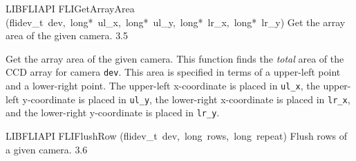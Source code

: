 \documentclass{article}
\begin{document}
\begin{cxxentry}
\begin{cxxfunction}
\begin{cxxdoc}
\end{cxxdoc}
\end{cxxfunction}
\begin{cxxfunction}
{LIBFLIAPI}
        {FLIGetArrayArea}
        {(flidev\_t\ dev,\ long*\ ul\_x,\ long*\ ul\_y,\ long*\ lr\_x,\ long*\ lr\_y)}
        { Get the array area of the given camera.}
        {3.5}
\begin{cxxdoc}

Get the array area of the given camera.  This function finds the
\emph{total} area of the CCD array for camera \texttt{dev}.  This
area is specified in terms of a upper-left point and a lower-right
point.  The upper-left x-coordinate is placed in \texttt{ul\_x}, the
upper-left y-coordinate is placed in \texttt{ul\_y}, the lower-right
x-coordinate is placed in \texttt{lr\_x}, and the lower-right
y-coordinate is placed in \texttt{lr\_y}.


\end{cxxdoc}
\end{cxxfunction}
\begin{cxxfunction}
{LIBFLIAPI}
        {FLIFlushRow}
        {(flidev\_t\ dev,\ long\ rows,\ long\ repeat)}
        { Flush rows of a given camera.}
        {3.6}
\begin{cxxdoc}


\end{cxxdoc}
\end{cxxfunction}
\end{cxxentry}
\end{document}
